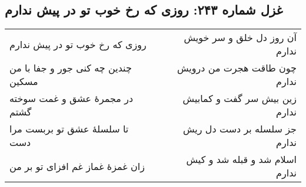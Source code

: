 \begin{center}
\section*{غزل شماره ۲۴۳: روزی که رخ خوب تو در پیش ندارم}
\label{sec:243}
\begin{longtable}{l p{0.5cm} r}
روزی که رخ خوب تو در پیش ندارم
&&
آن روز دل خلق و سر خویش ندارم
\\
چندین چه کنی جور و جفا با من مسکین
&&
چون طاقت هجرت من درویش ندارم
\\
در مجمرهٔ عشق و غمت سوخته گشتم
&&
زین بیش سر گفت و کمابیش ندارم
\\
تا سلسلهٔ عشق تو بربست مرا دست
&&
جز سلسله بر دست دل ریش ندارم
\\
زان غمزهٔ غماز غم افزای تو بر من
&&
اسلام شد و قبله شد و کیش ندارم
\\
\end{longtable}
\end{center}
